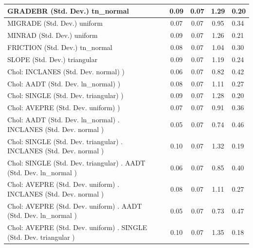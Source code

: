 \begin{table}
\begin{center}
\begin{tabular}{|l|l|c|c|c|l|}
			GRADEBR (Std. Dev.) tn_normal &  & 0.09 & 0.07 & 1.29 & 0.20 \\
			\hline
			MIGRADE (Std. Dev.) uniform &  & 0.07 & 0.07 & 0.95 & 0.34 \\
			\hline
			MINRAD (Std. Dev.) uniform &  & 0.09 & 0.07 & 1.26 & 0.21 \\
			\hline
			FRICTION (Std. Dev.) tn_normal &  & 0.08 & 0.07 & 1.04 & 0.30 \\
			\hline
			SLOPE (Std. Dev.) triangular &  & 0.09 & 0.07 & 1.19 & 0.24 \\
			\hline
			 Chol: INCLANES (Std. Dev. normal) ) &  & 0.06 & 0.07 & 0.82 & 0.42 \\
			\hline
			 Chol: AADT (Std. Dev. ln_normal) ) &  & 0.08 & 0.07 & 1.11 & 0.27 \\
			\hline
			 Chol: SINGLE (Std. Dev. triangular) ) &  & 0.09 & 0.07 & 1.28 & 0.20 \\
			\hline
			 Chol: AVEPRE (Std. Dev. uniform) ) &  & 0.07 & 0.07 & 0.91 & 0.36 \\
			\hline
			 Chol: AADT (Std. Dev. ln_normal) . INCLANES (Std. Dev.   normal ) &  & 0.05 & 0.07 & 0.74 & 0.46 \\
			\hline
			 Chol: SINGLE (Std. Dev. triangular) . INCLANES (Std. Dev.   normal ) &  & 0.10 & 0.07 & 1.32 & 0.19 \\
			\hline
			 Chol: SINGLE (Std. Dev. triangular) . AADT (Std. Dev.   ln_normal ) &  & 0.06 & 0.07 & 0.85 & 0.40 \\
			\hline
			 Chol: AVEPRE (Std. Dev. uniform) . INCLANES (Std. Dev.   normal ) &  & 0.08 & 0.07 & 1.11 & 0.27 \\
			\hline
			 Chol: AVEPRE (Std. Dev. uniform) . AADT (Std. Dev.   ln_normal ) &  & 0.05 & 0.07 & 0.73 & 0.47 \\
			\hline
			 Chol: AVEPRE (Std. Dev. uniform) . SINGLE (Std. Dev.   triangular ) &  & 0.10 & 0.07 & 1.35 & 0.18 \\
			\hline
		\end{tabular}
	\end{center}
\end{table}